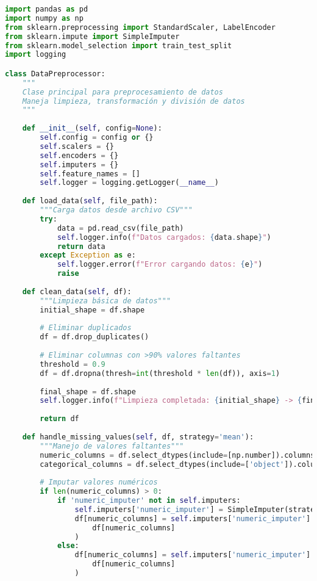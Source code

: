 \begin{lstlisting}[language=Python, caption=Módulo principal de preprocesamiento]
import pandas as pd
import numpy as np
from sklearn.preprocessing import StandardScaler, LabelEncoder
from sklearn.impute import SimpleImputer
from sklearn.model_selection import train_test_split
import logging

class DataPreprocessor:
    """
    Clase principal para preprocesamiento de datos
    Maneja limpieza, transformación y división de datos
    """
    
    def __init__(self, config=None):
        self.config = config or {}
        self.scalers = {}
        self.encoders = {}
        self.imputers = {}
        self.feature_names = []
        self.logger = logging.getLogger(__name__)
        
    def load_data(self, file_path):
        """Carga datos desde archivo CSV"""
        try:
            data = pd.read_csv(file_path)
            self.logger.info(f"Datos cargados: {data.shape}")
            return data
        except Exception as e:
            self.logger.error(f"Error cargando datos: {e}")
            raise
    
    def clean_data(self, df):
        """Limpieza básica de datos"""
        initial_shape = df.shape
        
        # Eliminar duplicados
        df = df.drop_duplicates()
        
        # Eliminar columnas con >90% valores faltantes
        threshold = 0.9
        df = df.dropna(thresh=int(threshold * len(df)), axis=1)
        
        final_shape = df.shape
        self.logger.info(f"Limpieza completada: {initial_shape} -> {final_shape}")
        
        return df
    
    def handle_missing_values(self, df, strategy='mean'):
        """Manejo de valores faltantes"""
        numeric_columns = df.select_dtypes(include=[np.number]).columns
        categorical_columns = df.select_dtypes(include=['object']).columns
        
        # Imputar valores numéricos
        if len(numeric_columns) > 0:
            if 'numeric_imputer' not in self.imputers:
                self.imputers['numeric_imputer'] = SimpleImputer(strategy=strategy)
                df[numeric_columns] = self.imputers['numeric_imputer'].fit_transform(
                    df[numeric_columns]
                )
            else:
                df[numeric_columns] = self.imputers['numeric_imputer'].transform(
                    df[numeric_columns]
                )
        

\end{lstlisting}

